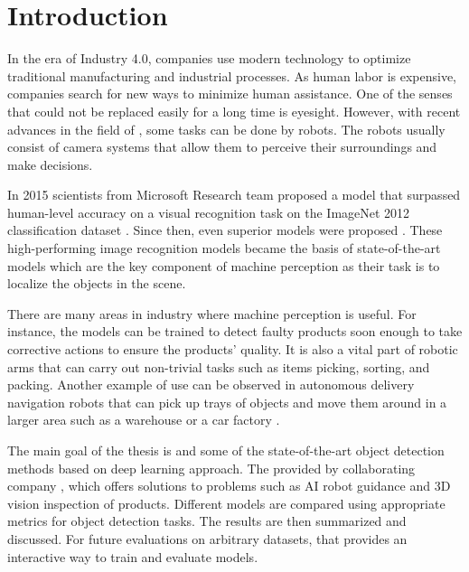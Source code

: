 \chapter{Introduction}

In the era of Industry 4.0, companies use modern technology to optimize
traditional manufacturing and industrial processes. As human labor is expensive,
companies search for new ways to minimize human assistance. One of the senses
that could not be replaced easily for a long time is eyesight. However, with
recent advances in the field of , some tasks can be done by
robots. The robots usually consist of camera systems that allow them to
perceive their surroundings and make decisions.

In 2015 scientists from Microsoft Research team proposed a 
model \cite{surp2015} that surpassed human-level accuracy on a visual
recognition task on the ImageNet 2012 classification dataset \cite{imagenet}.
Since then, even superior models were proposed \cite{resnet, efficientnet}.
These high-performing image recognition models became the basis of
state-of-the-art  models which are the key component of
machine perception as their task is to localize the objects in the scene.

There are many areas in industry where machine perception is useful. For
instance, the models can be trained to detect faulty products soon enough to
take corrective actions to ensure the products' quality. It is also a vital part
of robotic arms that can carry out non-trivial tasks such as items picking,
sorting, and packing. Another example of use can be observed in autonomous
delivery navigation robots that can pick up trays of objects and move them
around in a larger area such as a warehouse or a car factory \cite{bmw}.

The main goal of the thesis is  and  some of
the state-of-the-art object detection methods based on deep learning approach.
The  provided by
collaborating company , which offers solutions to problems
such as AI robot guidance and 3D vision inspection of products. Different models
are compared using appropriate metrics for object detection tasks. The results
are then summarized and discussed. For future evaluations on arbitrary datasets,
 that provides an interactive way to train
and evaluate models.

